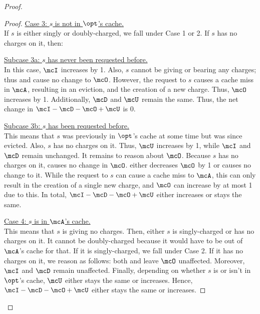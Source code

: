 \documentclass[11pt]{article}
\begin{document}
\begin{proof}
\begin{proof}
        \medskip\noindent\underline{Case 3: $s$ is not in $\opt$'s cache.} \\
        If $s$ is either singly or doubly-charged, we fall under Case 1 or 2. If $s$ has no charges on it, then:
        
        \smallskip         \noindent\underline{Subcase 3a: $s$ has never been requested before.} \\
        In this case, $\mcI$ increases by 1. Also, $s$ cannot be giving or bearing any charges; thus  and  cause no change to $\mcO$. However, the request to $s$ causes a cache miss in $\mcA$, resulting in an eviction, and the creation of a new charge. Thus, $\mcO$ increases by 1. Additionally, $\mcD$ and $\mcU$ remain the same. Thus, the net change in $\mcI - \mcD - \mcO + \mcU$ is 0.
        
        \smallskip         \noindent\underline{Subcase 3b: $s$ has been requested before.} \\
        This means that $s$ was previously in $\opt$'s cache at some time but was since evicted. Also, $s$ has no charges on it. Thus, $\mcU$ increases by 1, while $\mcI$ and $\mcD$ remain unchanged. It remains to reason about $\mcO$. Because $s$ has no charges on it,  causes no change in $\mcO$.
         either decreases $\mcO$ by 1 or causes no change to it.
        While the request to $s$ can cause a cache miss to $\mcA$, this can only result in the creation of a single new charge, and $\mcO$ can increase by at most 1 due to this. In total, $\mcI-\mcD-\mcO+\mcU$ either increases or stays the same. 
        
        \medskip
        \noindent\underline{Case 4: $s$ is in $\mcA$'s cache.} \\
        This means that $s$ is giving no charges. Then, either $s$ is singly-charged or has no charges on it. It cannot be doubly-charged because it would have to be out of $\mcA$'s cache for that. If it is singly-charged, we fall under Case 2. If it has no charges on it, we reason as follows: both  and  leave $\mcO$ unaffected. Moreover, $\mcI$ and $\mcD$ remain unaffected. Finally, depending on whether $s$ is or isn't in $\opt$'s cache, $\mcU$ either stays the same or increases. Hence, $\mcI-\mcD-\mcO+\mcU$ either stays the same or increases. 
        

\end{proof}
\end{proof}
\end{document}
